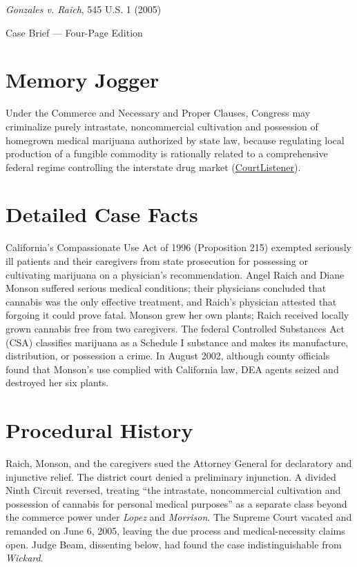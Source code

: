 \documentclass[12pt]{article}
\begin{document}
\begin{center}
{\LARGE \textit{Gonzales v. Raich}, 545 U.S. 1 (2005)\par}
\vspace{0.8em}
{\large Case Brief --- Four-Page Edition\par}
\end{center}
\vspace{1em}

\section{Memory Jogger}

Under the Commerce and Necessary and Proper Clauses, Congress may criminalize purely intrastate, noncommercial cultivation and possession of homegrown medical marijuana authorized by state law, because regulating local production of a fungible commodity is rationally related to a comprehensive federal regime controlling the interstate drug market (\href{https://www.courtlistener.com/opinion/799995/gonzales-v-raich/}{CourtListener}).

\section{Detailed Case Facts}

California's Compassionate Use Act of 1996 (Proposition 215) exempted seriously ill patients and their caregivers from state prosecution for possessing or cultivating marijuana on a physician's recommendation. Angel Raich and Diane Monson suffered serious medical conditions; their physicians concluded that cannabis was the only effective treatment, and Raich's physician attested that forgoing it could prove fatal. Monson grew her own plants; Raich received locally grown cannabis free from two caregivers. The federal Controlled Substances Act (CSA) classifies marijuana as a Schedule I substance and makes its manufacture, distribution, or possession a crime. In August 2002, although county officials found that Monson's use complied with California law, DEA agents seized and destroyed her six plants.

\section{Procedural History}

Raich, Monson, and the caregivers sued the Attorney General for declaratory and injunctive relief. The district court denied a preliminary injunction. A divided Ninth Circuit reversed, treating ``the intrastate, noncommercial cultivation and possession of cannabis for personal medical purposes'' as a separate class beyond the commerce power under \textit{Lopez} and \textit{Morrison}. The Supreme Court vacated and remanded on June 6, 2005, leaving the due process and medical-necessity claims open. Judge Beam, dissenting below, had found the case indistinguishable from \textit{Wickard}.
\end{document}
